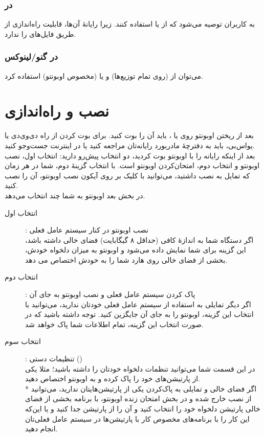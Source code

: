 \subsubsection{در }
به کاربران  توصیه می‌شود که از  یا  استفاده کنند. زیرا رایانهٔ  آن‌ها، قابلیت راه‌اندازی از طریق فایل‌های  را ندارد.

\subsubsection{در گنو/لینوکس}
می‌توان از  (روی تمام توزیع‌ها) و یا  (مخصوص اوبونتو) استفاده کرد.


\section{نصب و راه‌اندازی}
بعد از ریختن اوبونتو روی  یا ، باید آن را بوت کنید. برای بوت کردن از راه دی‌وی‌دی یا یواس‌بی، باید به دفترچهٔ مادربورد رایانه‌تان مراجعه کنید یا در اینترنت جست‌وجو کنید.\\
بعد از اینکه رایانه را با اوبونتو بوت کردید، دو انتخاب پیش‌رو دارید: انتخاب اول، نصب اوبونتو و انتخاب دوم، امتحان‌کردن اوبونتو است. با انتخاب گزینهٔ دوم، شما در هر زمان که تمایل به نصب داشتید، می‌توانید با کلیک بر روی آیکون نصب اوبونتو، آن را نصب کنید.\\
در بخش بعد اوبونتو به شما چند انتخاب می‌دهد.
\begin{description}
\item[انتخاب اول]: نصب اوبونتو در کنار سیستم عامل فعلی\\
اگر دستگاه شما به اندازهٔ کافی (حداقل ۸ گیگابایت) فضای خالی داشته باشد، این گزینه برای شما نمایش داده می‌شود و اوبونتو به میزان دلخواه خودش، بخشی از فضای خالی روی هارد شما را به خودش اختصاص می دهد.

\item[انتخاب دوم]: پاک کردن سیستم عامل فعلی و نصب اوبونتو به جای آن\\
اگر دیگر تمایلی به استفاده از سیستم عامل فعلی خودتان ندارید، می‌توانید با انتخاب این گزینه، اوبونتو را به جای آن جایگزین کنید. توجه داشته باشید که در صورت انتخاب این گزینه، تمام اطلاعات شما پاک خواهد شد.

\item[انتخاب سوم]: تنظیمات دستی ()\\
در این قسمت شما می‌توانید تنظمات دلخواه خودتان را داشته باشید؛ مثلا یکی از پارتیشن‌های خود را پاک کرده و به اوبونتو اختصاص دهید.\\
* اگر فضای خالی و تمایلی به پاک‌کردن یکی  از پارتیشن‌هایتان ندارید، می‌توانید از نصب خارج شده و در بخش امتحان زنده اوبونتو، با برنامه  بخشی از فضای خالی پارتیشن  دلخواه خود را انتخاب کنید و آن را از پارتیشن جدا کنید و یا این‌که این کار را با برنامه‌های مخصوص کار با پارتیشن‌ها در سیستم عامل فعلی‌تان انجام دهید.
\end{description}


